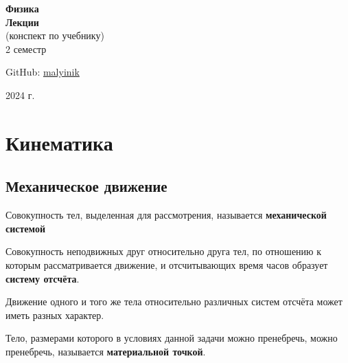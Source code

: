 



\begin{titlepage}
    \vspace*{0pt}
    \vfill
    \centering
    \Huge\textbf{Физика} \\[7pt]
    \Large\textbf{Лекции} \\
    \small (конспект по учебнику) \\
    \large 2 семестр\\ 
    \vfill
    \begin{flushright}
        \normalsize GitHub: \href{https://github.com/malyinik}{malyinik} \\
    \end{flushright}
    \normalsize 2024 г.
\end{titlepage}
\newpage

\tableofcontents
\newpage



\section{Кинематика}

\subsection{Механическое движение}

\begin{definition}
    Совокупность тел, выделенная для рассмотрения, называется \textbf{механической системой}
\end{definition}

\begin{definition}
    Совокупность неподвижных друг относительно друга тел, по отношению к которым рассматривается движение, и отсчитывающих время часов образует \textbf{систему отсчёта}.
\end{definition}

\begin{note}
    Движение одного и того же тела относительно различных систем отсчёта может иметь разных характер.
\end{note}

\begin{definition}
    Тело, размерами которого в условиях данной задачи можно пренебречь, можно пренебречь, называется \textbf{материальной точкой}.
\end{definition}

